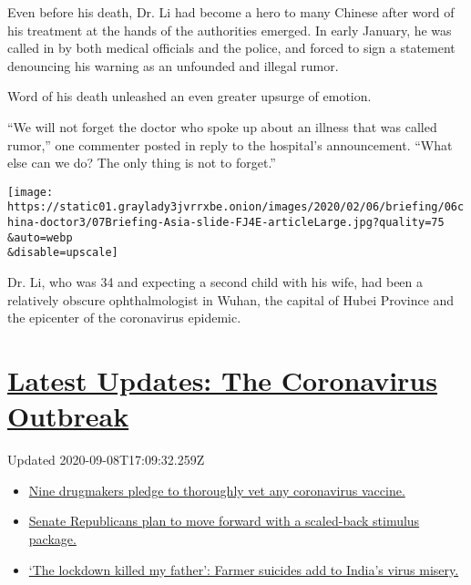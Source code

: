 Even before his death, Dr. Li had become a hero to many Chinese after
word of his treatment at the hands of the authorities emerged. In early
January, he was called in by both medical officials and the police, and
forced to sign a statement denouncing his warning as an unfounded and
illegal rumor.

Word of his death unleashed an even greater upsurge of emotion.

``We will not forget the doctor who spoke up about an illness that was
called rumor,'' one commenter posted in reply to the hospital's
announcement. ``What else can we do? The only thing is not to forget.''

\texttt{[image: https://static01.graylady3jvrrxbe.onion/images/2020/02/06/briefing/06china-doctor3/07Briefing-Asia-slide-FJ4E-articleLarge.jpg?quality=75\\\&auto=webp\\\&disable=upscale]}

Dr. Li, who was 34 and expecting a second child with his wife, had been
a relatively obscure ophthalmologist in Wuhan, the capital of Hubei
Province and the epicenter of the coronavirus epidemic.

\hypertarget{latest-updates-the-coronavirus-outbreak}{%
\section{\texorpdfstring{\href{https://www.nytimes3xbfgragh.onion/2020/09/08/world/covid-19-coronavirus.html?action=click\&pgtype=Article\&state=default\&region=MAIN_CONTENT_1\&context=storylines_live_updates}{Latest
Updates: The Coronavirus
Outbreak}}{Latest Updates: The Coronavirus Outbreak}}\label{latest-updates-the-coronavirus-outbreak}}

Updated 2020-09-08T17:09:32.259Z

\begin{itemize}
\tightlist
\item
  \href{https://www.nytimes3xbfgragh.onion/2020/09/08/world/covid-19-coronavirus.html?action=click\&pgtype=Article\&state=default\&region=MAIN_CONTENT_1\&context=storylines_live_updates\#link-679303d7}{Nine
  drugmakers pledge to thoroughly vet any coronavirus vaccine.}
\item
  \href{https://www.nytimes3xbfgragh.onion/2020/09/08/world/covid-19-coronavirus.html?action=click\&pgtype=Article\&state=default\&region=MAIN_CONTENT_1\&context=storylines_live_updates\#link-547feae1}{Senate
  Republicans plan to move forward with a scaled-back stimulus package.}
\item
  \href{https://www.nytimes3xbfgragh.onion/2020/09/08/world/covid-19-coronavirus.html?action=click\&pgtype=Article\&state=default\&region=MAIN_CONTENT_1\&context=storylines_live_updates\#link-1c973131}{`The
  lockdown killed my father': Farmer suicides add to India's virus
  misery.}
\end{itemize}

